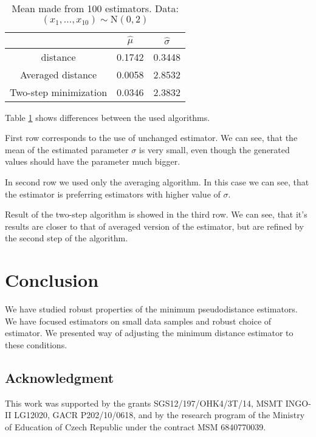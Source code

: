 {\begin{table}[htb] 
\begin{center}
\begin{tabular}{|c|c|c|}
\hline  
 &${\hat{\mu}}$ & ${\hat{\sigma}} $\\
\hline
\R distance& 0.1742  &  0.3448 \\    
Averaged \R distance& 0.0058  &  2.8532 \\ 
Two-step minimization& 0.0346  &  2.3832 \\
\hline
\end{tabular}
\end{center}
\caption{Mean made from 100 estimators. Data: $(x_1,\ldots,x_{10}) \sim \mathrm{N}(0,2)$}
\label{tabJK:RenPla}

\end{table}

Table \ref{tabJK:RenPla} shows differences between the used algorithms. 

First row corresponds to the use of unchanged \R estimator. We can see, that the mean of the estimated parameter $\sigma$ is very small, even though the generated values should have the parameter much bigger.

In second row we used only the averaging algorithm. In this case we can see, that the estimator is preferring estimators with higher value of $\sigma$. 

Result of the two-step algorithm is showed in the third row. We can see, that it's results are closer to that of averaged version of the estimator, but are refined by the second step of the algorithm.


\section{Conclusion}
We have studied robust properties of the minimum \R pseudodistance estimators. We have focused estimators on small data samples and robust choice of estimator. 
We presented way of adjusting the \R minimum distance estimator to these conditions.
\subsection*{Acknowledgment}
This work was supported by the grants SGS12/197/OHK4/3T/14, MSMT INGO-II LG12020, GACR P202/10/0618, and by the research program of the Ministry of Education of Czech Republic under the contract MSM 6840770039.

\begin{thebibliography}{10}


\end{thebibliography}}
